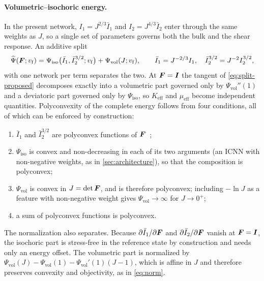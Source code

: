 \paragraph{Volumetric--isochoric energy.} In the present network, $I_1=J^{2/3}\bar I_1$
and $I_2=J^{4/3}\bar I_2$ enter through the same weights as $J$, so a single set of
parameters governs both the bulk and the shear response. An additive split
\begin{equation}
  \widehat\Psi(\bm F;v_{\mathrm f})=\Psi_{\mathrm{iso}}\bigl(\bar I_1,\bar I_2^{3/2};v_{\mathrm f}\bigr)
  +\Psi_{\mathrm{vol}}(J;v_{\mathrm f}),\qquad
  \bar I_1=J^{-2/3}I_1,\quad \bar I_2^{3/2}=J^{-2}I_2^{3/2},
  \label{eq:split-proposed}
\end{equation}
with one network per term separates the two. At $\bm F=\bm I$ the tangent of
\cref{eq:split-proposed} decomposes exactly into a volumetric part governed only by
$\Psi_{\mathrm{vol}}''(1)$ and a deviatoric part governed only by $\Psi_{\mathrm{iso}}$,
so $K_{\mathrm{eff}}$ and $\mu_{\mathrm{eff}}$ become independent quantities. Polyconvexity of
the complete energy follows from four conditions, all of which can be enforced by
construction:
\begin{enumerate}
  \item $\bar I_1$ and $\bar I_2^{3/2}$ are polyconvex functions of
        $\bm F$~\cite[Lemmas~2.1 and~2.2]{Hartmann2003};
  \item $\Psi_{\mathrm{iso}}$ is convex and non-decreasing in each of its two
        arguments (an ICNN with non-negative weights, as in \cref{sec:architecture}),
        so that the composition is polyconvex;
  \item $\Psi_{\mathrm{vol}}$ is convex in $J=\det\bm F$, and is therefore polyconvex;
        including $-\ln J$ as a feature with non-negative weight gives
        $\Psi_{\mathrm{vol}}\to\infty$ for $J\to0^{+}$;
  \item a sum of polyconvex functions is polyconvex.
\end{enumerate}
The normalization also separates. Because $\partial\bar I_1/\partial\bm F$ and
$\partial\bar I_2/\partial\bm F$ vanish at $\bm F=\bm I$, the isochoric part is stress-free
in the reference state by construction and needs only an energy offset. The
volumetric part is normalized by
$\Psi_{\mathrm{vol}}(J)-\Psi_{\mathrm{vol}}(1)-\Psi_{\mathrm{vol}}'(1)(J-1)$, which is affine in
$J$ and therefore preserves convexity and objectivity, as in \cref{eq:norm}.

